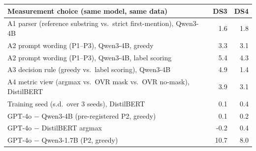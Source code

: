\begin{tabular}{@{}p{5.4cm}rr@{}}
\toprule
Measurement choice (same model, same data) & DS3 & DS4 \\
\midrule
A1 parser (reference substring vs.\ strict first-mention), Qwen3-4B & 1.6 & 1.8 \\
A2 prompt wording (P1--P3), Qwen3-4B, greedy & 3.3 & 3.1 \\
A2 prompt wording (P1--P3), Qwen3-4B, label scoring & 5.4 & 4.3 \\
A3 decision rule (greedy vs.\ label scoring), Qwen3-4B & 4.9 & 1.4 \\
A4 metric view (argmax vs.\ OVR mask vs.\ OVR no-mask), DistilBERT & 3.9 & 3.1 \\
Training seed (s.d.\ over 3 seeds), DistilBERT & 0.1 & 0.4 \\
\midrule
GPT-4o $-$ Qwen3-4B (pre-registered P2, greedy) & 0.1 & 0.2 \\
GPT-4o $-$ DistilBERT argmax & -0.2 & 0.4 \\
GPT-4o $-$ Qwen3-1.7B (P2, greedy) & 10.7 & 8.0 \\
\bottomrule
\end{tabular}
